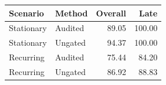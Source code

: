 \begin{tabular}{llrr}
\toprule
Scenario & Method & Overall & Late \\
\midrule
Stationary & Audited & 89.05 & 100.00 \\
Stationary & Ungated & 94.37 & 100.00 \\
Recurring & Audited & 75.44 & 84.20 \\
Recurring & Ungated & 86.92 & 88.83 \\
\bottomrule
\end{tabular}
